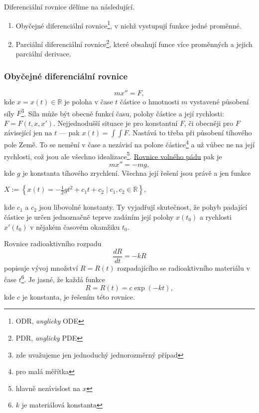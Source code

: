 \documentclass[../main.tex]{subfiles}
\begin{document}
\begin{remark}
    Diferenciální rovnice dělíme na následující.
    \begin{enumerate}
        \item Obyčejné diferenciální rovnice\footnote{ODR, \textit{anglicky} ODE}, v nichž vystupují funkce jedné proměnné.
        \item Parciální diferenciální rovnice\footnote{PDR, \textit{anglicky} PDE}, které obsahují funce více proměnných a jejich parciální derivace.
    \end{enumerate}
\end{remark}

\subsubsection{Obyčejné diferenciální rovnice}

\begin{example}
    \[ mx'' = F, \]
    kde $x=x(t)\in\mathbb{R}$ je poloha v čase $t$ částice o hmotnosti $m$ vystavené působení síly $F$\footnote{zde uvažujeme jen jednoduchý jednorozměrný případ}.
    Síla může být obecně funkcí času, polohy částice a její rychlosti: $F = F(t,x,x')$. Nejjednodušší situace je pro konstantní $F$,
    či obecněji pro $F$ závisející jen na $t$ --- pak $x(t) = \int\int F$. Nastává to třeba při působení
    tíhového pole Země. To se nemění v čase a nezávisí na poloze částice\footnote{pro malá měřítka} a už vůbec ne na její rychlosti,
    což jsou ale všechno idealizace\footnote{hlavně nezávislost na $x$}.
    \underline{Rovnice volného pádu} pak je 
    \[ mx'' = -mg, \]
    kde $g$ je konstanta tíhového zrychlení.
    Všechna její řešení jsou právě a jen funkce
    \begin{center} $ X := \left\{ x(t) = -\frac{1}{2}gt^2 + c_1t + c_2 \mid c_1,c_2 \in \mathbb{R} \right\}, $ \end{center}
    kde $c_1$ a $c_2$ jsou libovolné konstanty. Ty vyjadřují skutečnost, že pohyb padající částice
    je určen jednoznačně teprve zadáním její polohy $x(t_0)$ a rychlosti $x'(t_0)$ v nějakém časovém okamžiku $t_0$.
\end{example}

\begin{example}
    Rovnice radioaktivního rozpadu
    \[ \frac{dR}{dt} = -kR \]
    popisuje vývoj množství $R = R(t)$ rozpadajícího se radioaktivního materiálu v čase $t$\footnote{$k$ je materiálová konstanta}.
    Je jasné, že každá funkce
    \[ R = R(t) = c \exp(-kt), \]
    kde $c$ je konstanta, je řešením této rovnice.
\end{example}
\end{document}
